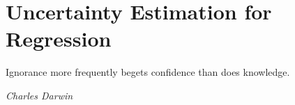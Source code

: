 \chapter{Uncertainty Estimation for Regression}
\label{chap:regression}

\epigraph{Ignorance more frequently begets confidence than does knowledge.}{\textit{Charles Darwin}}







